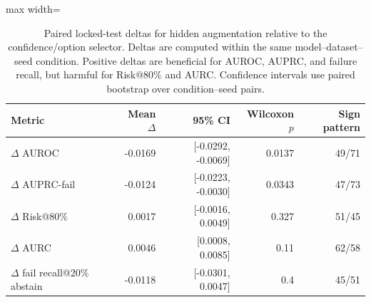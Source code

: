 
\begin{table}[t]
\centering
\small
\caption{Paired locked-test deltas for hidden augmentation relative to the confidence/option selector. Deltas are computed within the same model--dataset--seed condition. Positive deltas are beneficial for AUROC, AUPRC, and failure recall, but harmful for Risk@80\% and AURC. Confidence intervals use paired bootstrap over condition--seed pairs.}
\label{tab:locked-paired-deltas}
\begin{adjustbox}{max width=\textwidth}
\begin{tabular}{lrrrr}
\toprule
Metric & Mean $\Delta$ & 95\% CI & Wilcoxon $p$ & Sign pattern \\
\midrule
$\Delta$ AUROC & -0.0169 & [-0.0292, -0.0069] & 0.0137 & 49/71 \\
$\Delta$ AUPRC-fail & -0.0124 & [-0.0223, -0.0030] & 0.0343 & 47/73 \\
$\Delta$ Risk@80\% & 0.0017 & [-0.0016, 0.0049] & 0.327 & 51/45 \\
$\Delta$ AURC & 0.0046 & [0.0008, 0.0085] & 0.11 & 62/58 \\
$\Delta$ fail recall@20\% abstain & -0.0118 & [-0.0301, 0.0047] & 0.4 & 45/51 \\
\bottomrule
\end{tabular}
\end{adjustbox}
\end{table}
